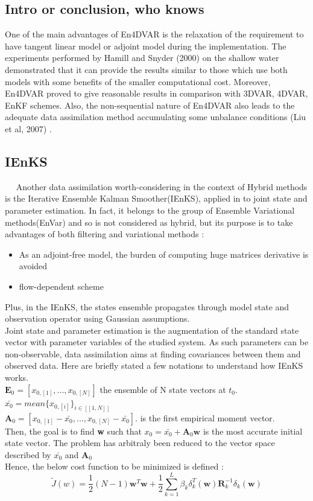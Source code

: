 \documentclass[a4,12pt]{article}
\numberwithin{equation}{section}
\begin{document}
\subsection{Intro or conclusion, who knows}


One of the main advantages of En4DVAR is the relaxation of the requirement to have tangent linear model or adjoint model during the implementation. The experiments performed by Hamill and Snyder (2000) on the shallow water demonstrated that it can  provide the results similar to those which use both models with some benefits of the smaller computational cost. Moreover, En4DVAR proved to give reasonable results in comparison with 3DVAR, 4DVAR, EnKF schemes. Also, the non-sequential nature of En4DVAR also leads to the adequate data assimilation method accumulating some unbalance conditions (Liu et al, 2007) \cite{En4DVAR}.  


\subsection{IEnKS}
~~ Another data assimilation worth-considering in the context of Hybrid methods is the Iterative Ensemble Kalman Smoother(IEnKS), applied in \cite{jointState} to joint state and parameter estimation. In fact, it belongs to the group of Ensemble Variational methods(EnVar) and so is not considered as hybrid, but its purpose is to take advantages of both filtering and variational methods :
\begin{itemize}
\item As an adjoint-free model, the burden of computing huge matrices derivative is avoided
\item flow-dependent scheme
\end{itemize}
Plus, in the IEnKS, the states ensemble propagates through model state and observation operator using Gaussian assumptions. \\
Joint state and parameter estimation is the augmentation of the standard state vector with parameter variables of the studied system. As such parameters can be non-observable, data assimilation aims at finding covariances between them and observed data.
Here are briefly stated a few notations to understand how IEnKS works. \\
$\textbf{E}_0 = [x_{0,[1]},...,x_{0,[N]}]$ the ensemble of N state vectors at $t_0$. \\
$\bar{x_0} = mean\{x_{0,[i]}\}_{i \in [\![1,N]\!] }$ \\
$\textbf{A}_0 = [x_{0,[1]} - \bar{x_0},...,x_{0,[N]}- \bar{x_0}]$. is the first empirical moment vector.\\
Then, the goal is to find \textbf{w} such that $x_0 = \bar{x_0} + \textbf{A}_0 \textbf{w}$ is the most accurate initial state vector. The problem has arbitraly been reduced to the vector space described by $\bar{x_0}$ and $\textbf{A}_0$ \\
Hence, the below cost function to be minimized is defined : 
$$\tilde{J}(w) = \frac{1}{2}(N-1)\textbf{w}^{T}\textbf{w} + \frac{1}{2}\sum_{k=1}^{L}\beta_{k}\delta_{k}^{T}(\textbf{w})\textbf{R}_{k}^{-1}\delta_{k}(\textbf{w})$$
\end{document}
